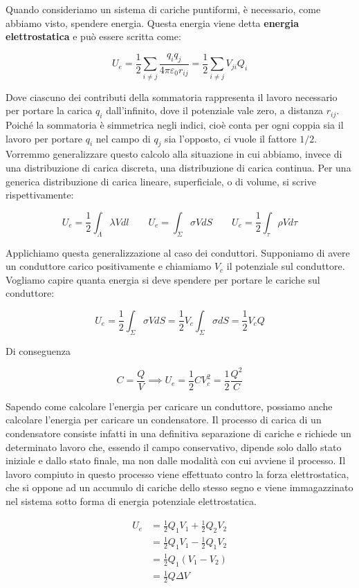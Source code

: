 Quando consideriamo un sistema di cariche puntiformi, è necessario, come abbiamo visto, spendere energia. Questa energia viene detta \textbf{energia elettrostatica} e può essere scritta come:

\[
	U_e =\frac{1}{2} \sum_{i\neq j} \frac{q_iq_j}{4\pi \varepsilon_0 r_{ij}} = \frac{1}{2} \sum_{i\neq j} V_{ji}Q_i
\]

Dove ciascuno dei contributi della sommatoria rappresenta il lavoro necessario per portare la carica $ q_i  $ dall'infinito, dove il potenziale vale zero, a distanza $ r_{ij}  $. Poiché la sommatoria è simmetrica negli indici, cioè conta per ogni coppia sia il lavoro per portare $ q_i  $ nel campo di $ q_j  $ sia l'opposto, ci vuole il fattore $1/2$. Vorremmo generalizzare questo calcolo alla situazione in cui abbiamo, invece di una distribuzione di carica discreta, una distribuzione di carica continua. Per una generica distribuzione di carica lineare, superficiale, o di volume, si scrive rispettivamente:

\[
	U_e=\frac{1}{2} \int_{\Lambda}\lambda V dl \qquad U_e=\int_{\Sigma}\sigma V dS \qquad U_e=\frac{1}{2} \int_{\tau}\rho V d\tau
\]

Applichiamo questa generalizzazione al caso dei conduttori. Supponiamo di avere un conduttore carico positivamente e chiamiamo $ V_c  $ il potenziale sul conduttore. Vogliamo capire quanta energia si deve spendere per portare le cariche sul conduttore:

\[
	U_e = \frac{1}{2} \int_{\Sigma}\sigma V dS= \frac{1}{2} V_c \int_{\Sigma}\sigma dS = \frac{1}{2} V_c Q
\]

Di conseguenza

\[
	C=\frac{Q}{V} \implies U_e = \frac{1}{2} CV_c^2 = \frac{1}{2} \frac{Q^2}{C}
\]

Sapendo come calcolare l'energia per caricare un conduttore, possiamo anche calcolare l'energia per caricare un condensatore. Il processo di carica di un condensatore consiste infatti in una definitiva separazione di cariche e richiede un determinato lavoro che, essendo il campo conservativo, dipende solo dallo stato iniziale e dallo stato finale, ma non dalle modalità con cui avviene il processo. Il lavoro compiuto in questo processo viene effettuato contro la forza elettrostatica, che si oppone ad un accumulo di cariche dello stesso segno e viene immagazzinato nel sistema sotto forma di energia potenziale elettrostatica.

\begin{align*}
	U_e &= \frac{1}{2} Q_1V_1 + \frac{1}{2}  Q_2V_2 \\
	&= \frac{1}{2} Q_1V_1 - \frac{1}{2}  Q_1V_2 \\
	&= \frac{1}{2} Q_1 (V_1 - V_2) \\
	&= \frac{1}{2} Q \Delta V
\end{align*}

